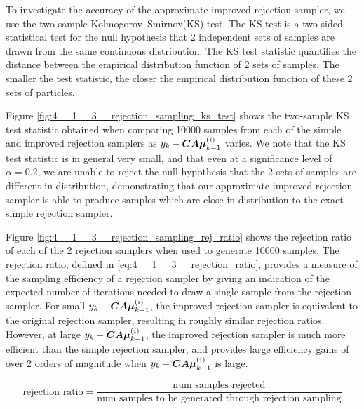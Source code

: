 \documentclass[../main.tex]{subfiles}
\begin{document}
To investigate the accuracy of the approximate improved rejection sampler, we use the two-sample Kolmogorov–Smirnov(KS) test. The KS test is a two-sided statistical test for the null hypothesis that 2 independent sets of samples are drawn from the same continuous distribution. The KS test statistic quantifies the distance between the empirical distribution function of 2 sets of samples. The smaller the test statistic, the closer the empirical distribution function of these 2 sets of particles. 

Figure \ref{fig:4__1__3__rejection_sampling_ks_test} shows the two-sample KS test statistic obtained when comparing 10000 samples from each of the simple and improved rejection samplers as $y_k - \bm{CA\mu}_{k-1}^{(i)}$ varies. We note that the KS test statistic is in general very small, and that even at a significance level of $\alpha=0.2$, we are unable to reject the null hypothesis that the 2 sets of samples are different in distribution, demonstrating that our approximate improved rejection sampler is able to produce samples which are close in distribution to the exact simple rejection sampler. 

Figure \ref{fig:4__1__3__rejection_sampling_rej_ratio} shows the rejection ratio of each of the 2 rejection samplers when used to generate 10000 samples. The rejection ratio, defined in \autoref{eq:4__1__3__rejection_ratio}, provides a measure of the sampling efficiency of a rejection sampler by giving an indication of the expected number of iterations needed to draw a single sample from the rejection sampler. For small $y_k - \bm{CA\mu}_{k-1}^{(i)}$, the improved rejection sampler is equivalent to the original rejection sampler, resulting in roughly similar rejection ratios. However, at large $y_k - \bm{CA\mu}_{k-1}^{(i)}$, the improved rejection sampler is much more efficient than the simple rejection sampler, and provides large efficiency gains of over 2 orders of magnitude when $y_k - \bm{CA\mu}_{k-1}^{(i)}$ is large. 

\begin{equation}
	\text{rejection ratio} = \frac{\text{num samples rejected}}{\text{num samples to be generated through rejection sampling}}
	\label{eq:4__1__3__rejection_ratio}
\end{equation}
\end{document}
